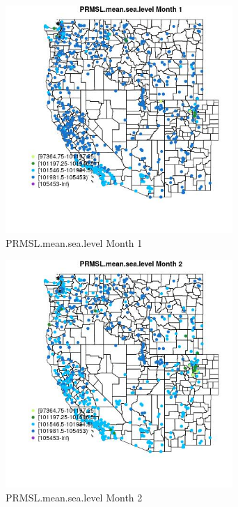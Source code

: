 \begin{figure} 
\centering  
\includegraphics[width=0.77\textwidth]{Code_Outputs/Report_ML_input_PM25_Step4_part_e_de_duplicated_aves_compiled_2019-05-21wNAs_MapObsMo1PRMSLmeansealevel.jpg} 
\caption{\label{fig:Report_ML_input_PM25_Step4_part_e_de_duplicated_aves_compiled_2019-05-21wNAsMapObsMo1PRMSLmeansealevel}PRMSL.mean.sea.level Month 1} 
\end{figure} 
 

\begin{figure} 
\centering  
\includegraphics[width=0.77\textwidth]{Code_Outputs/Report_ML_input_PM25_Step4_part_e_de_duplicated_aves_compiled_2019-05-21wNAs_MapObsMo2PRMSLmeansealevel.jpg} 
\caption{\label{fig:Report_ML_input_PM25_Step4_part_e_de_duplicated_aves_compiled_2019-05-21wNAsMapObsMo2PRMSLmeansealevel}PRMSL.mean.sea.level Month 2} 
\end{figure} 
 

